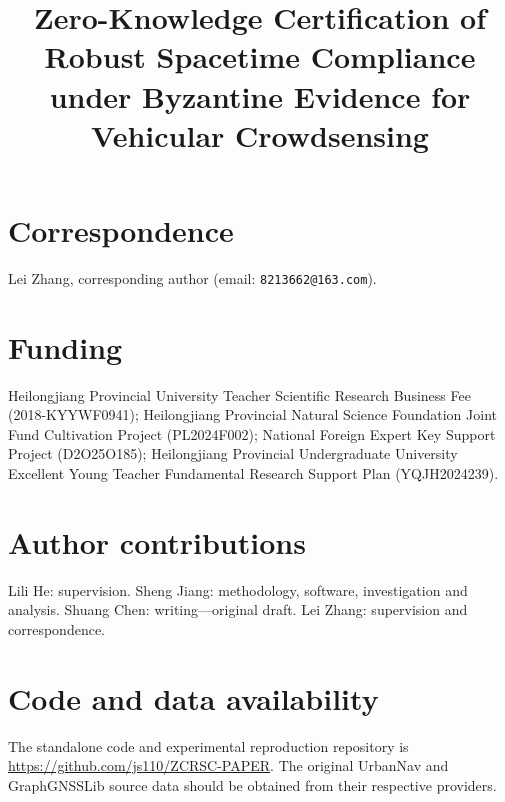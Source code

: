 \documentclass[pdflatex,sn-basic,Numbered]{sn-jnl}
\begin{document}
\title{Zero-Knowledge Certification of Robust Spacetime Compliance under Byzantine Evidence for Vehicular Crowdsensing}
\author[1]{ }
\author[1]{ }
\author[1]{ }
\author*[1]{ }
\maketitle
\section*{Correspondence}
Lei Zhang, corresponding author (email: \texttt{8213662@163.com}).
\section*{Funding}
Heilongjiang Provincial University Teacher Scientific Research Business Fee (2018-KYYWF0941); Heilongjiang Provincial Natural Science Foundation Joint Fund Cultivation Project (PL2024F002); National Foreign Expert Key Support Project (D2O25O185); Heilongjiang Provincial Undergraduate University Excellent Young Teacher Fundamental Research Support Plan (YQJH2024239).
\section*{Author contributions}
Lili He: supervision. Sheng Jiang: methodology, software, investigation and analysis. Shuang Chen: writing---original draft. Lei Zhang: supervision and correspondence.
\section*{Code and data availability}
The standalone code and experimental reproduction repository is \url{https://github.com/js110/ZCRSC-PAPER}. The original UrbanNav and GraphGNSSLib source data should be obtained from their respective providers.
\end{document}
